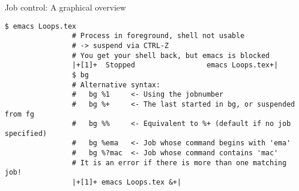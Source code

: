 \begin{frame}[fragile]{Job control: A graphical overview}
\begin{overlayarea}{\textwidth}{0.7\textheight}
\begin{onlyenv}
\begin{lstlisting}[style=MyBash, xrightmargin=2mm, xleftmargin=2mm, firstnumber=26]
                $ emacs Loops.tex
                # Process in foreground, shell not usable
                # -> suspend via CTRL-Z 
                # You get your shell back, but emacs is blocked
                |+[1]+  Stopped                 emacs Loops.tex+|
                $ bg 
                # Alternative syntax:
                #   bg %1     <- Using the jobnumber
                #   bg %+     <- The last started in bg, or suspended from fg
                #   bg %%     <- Equivalent to %+ (default if no job specified)
                #   bg %ema   <- Job whose command begins with 'ema'
                #   bg %?mac  <- Job whose command contains 'mac'
                # It is an error if there is more than one matching job!
                |+[1]+ emacs Loops.tex &+|
            \end{lstlisting}
        \end{onlyenv}
    \end{overlayarea}
\end{frame}
